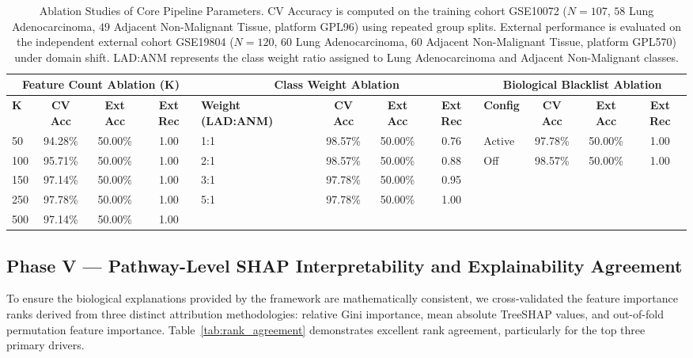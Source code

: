 \documentclass[journal,10pt]{IEEEtran}
\begin{document}
\begin{table}[htbp]
\centering
\caption{Ablation Studies of Core Pipeline Parameters. CV Accuracy is computed on the training cohort GSE10072 ($N=107$, $58$ Lung Adenocarcinoma, $49$ Adjacent Non-Malignant Tissue, platform GPL96) using repeated group splits. External performance is evaluated on the independent external cohort GSE19804 ($N=120$, $60$ Lung Adenocarcinoma, $60$ Adjacent Non-Malignant Tissue, platform GPL570) under domain shift. LAD:ANM represents the class weight ratio assigned to Lung Adenocarcinoma and Adjacent Non-Malignant classes.}
\label{tab:ablation_results}
\begin{tabular}{lccc|lccc|lccc}
\toprule
\multicolumn{4}{c}{\textbf{Feature Count Ablation (K)}} & \multicolumn{4}{c}{\textbf{Class Weight Ablation}} & \multicolumn{4}{c}{\textbf{Biological Blacklist Ablation}} \\
\midrule
\textbf{K} & \textbf{CV Acc} & \textbf{Ext Acc} & \textbf{Ext Rec} & \textbf{Weight (LAD:ANM)} & \textbf{CV Acc} & \textbf{Ext Acc} & \textbf{Ext Rec} & \textbf{Config} & \textbf{CV Acc} & \textbf{Ext Acc} & \textbf{Ext Rec} \\
\midrule
50  & 94.28\% & 50.00\% & 1.00 & 1:1 & 98.57\% & 50.00\% & 0.76 & Active & 97.78\% & 50.00\% & 1.00 \\
100 & 95.71\% & 50.00\% & 1.00 & 2:1 & 98.57\% & 50.00\% & 0.88 & Off    & 98.57\% & 50.00\% & 1.00 \\
150 & 97.14\% & 50.00\% & 1.00 & 3:1 & 97.78\% & 50.00\% & 0.95 &        &         &         &      \\
250 & 97.78\% & 50.00\% & 1.00 & 5:1 & 97.78\% & 50.00\% & 1.00 &        &         &         &      \\
500 & 97.14\% & 50.00\% & 1.00 &     &         &         &      &        &         &         &      \\
\bottomrule
\end{tabular}
\end{table}

\subsection{Phase V --- Pathway-Level SHAP Interpretability and Explainability Agreement}
To ensure the biological explanations provided by the framework are mathematically consistent, we cross-validated the feature importance ranks derived from three distinct attribution methodologies: relative Gini importance, mean absolute TreeSHAP values, and out-of-fold permutation feature importance. Table~\ref{tab:rank_agreement} demonstrates excellent rank agreement, particularly for the top three primary drivers.
\end{document}
